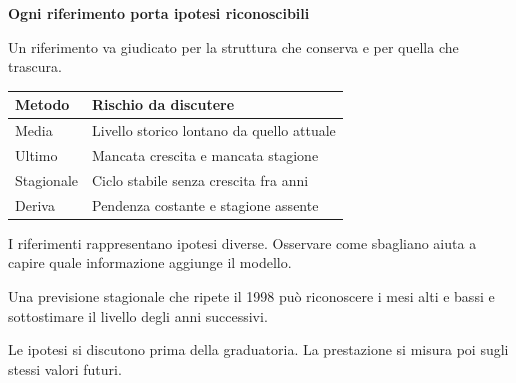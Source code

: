\documentclass[12pt,aspectratio=1610]{beamer}
\newcommand{\PBody}[1]{\par{\fontsize{11.3}{14.8}\selectfont #1\par}}
\newcommand{\PSmall}[1]{\par{\fontsize{9.8}{13.1}\selectfont #1\par}}
\newcommand{\PInfo}[1]{%
\begin{tcolorbox}[enhanced,arc=1.6mm,boxrule=.55pt,colback=GeoTint,
 colframe=Rule!80!Classical,left=2.3mm,right=2.3mm,top=2mm,bottom=2mm,
 before skip=1mm,after skip=1mm]
\PSmall{#1}\end{tcolorbox}}
\begin{document}
\begin{frame}[plain]\hypertarget{slide17}{}
\begin{lrbox}{\TitleBox}
\begin{minipage}[t]{17.7cm}\raggedright\color{Ink}\fontsize{11.3}{14.8}\selectfont
\color{Navy}\bfseries\fontsize{20.6}{24.5}\selectfont Ogni riferimento porta ipotesi riconoscibili
\end{minipage}\end{lrbox}

\begin{lrbox}{\RecallBox}
\begin{minipage}[t]{14.3cm}\raggedright\color{Ink}\fontsize{11.3}{14.8}\selectfont
\fontsize{10.3}{13.8}\selectfont Un riferimento va giudicato per la struttura che conserva e per quella che trascura.
\end{minipage}\end{lrbox}

\begin{lrbox}{\PilotLeftBox}
\begin{minipage}[t]{10.05cm}\raggedright\color{Ink}\fontsize{11.3}{14.8}\selectfont
{\fontsize{10.2}{13.1}\selectfont\renewcommand{\arraystretch}{1.45}\begin{tabular}{@{}p{2.9cm}p{6.1cm}@{}}\toprule
\textbf{Metodo} & \textbf{Rischio da discutere}\\\midrule
Media & Livello storico lontano da quello attuale\\
Ultimo & Mancata crescita e mancata stagione\\
Stagionale & Ciclo stabile senza crescita fra anni\\
Deriva & Pendenza costante e stagione assente\\
\bottomrule\end{tabular}}

\end{minipage}\end{lrbox}

\begin{lrbox}{\PilotRightBox}
\begin{minipage}[t]{7.55cm}\raggedright\color{Ink}\fontsize{11.3}{14.8}\selectfont
\PBody{I riferimenti rappresentano ipotesi diverse. Osservare come sbagliano aiuta a capire quale informazione aggiunge il modello.}
\vspace{2.5mm}
\PInfo{Una previsione stagionale che ripete il 1998 può riconoscere i mesi alti e bassi e sottostimare il livello degli anni successivi.}
\PBody{Le ipotesi si discutono prima della graduatoria. La prestazione si misura poi sugli stessi valori futuri.}
\vspace{2.5mm}


\end{minipage}
\end{lrbox}
\end{frame}
\end{document}
